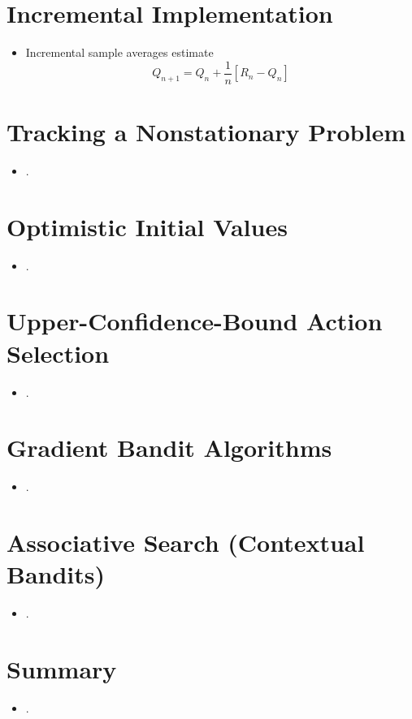 \documentclass{article}
\begin{document}
\section{Incremental Implementation}
\begin{itemize}
    \item Incremental sample averages estimate 
    $$ Q_{n+1} = Q_n + \frac{1}{n}[R_n - Q_n] $$
\end{itemize}

\section{Tracking a Nonstationary Problem}
\begin{itemize}
    \item .
\end{itemize}

\section{Optimistic Initial Values}
\begin{itemize}
    \item .
\end{itemize}

\section{Upper-Confidence-Bound Action Selection}
\begin{itemize}
    \item .
\end{itemize}

\section{Gradient Bandit Algorithms}
\begin{itemize}
    \item .
\end{itemize}

\section{Associative Search (Contextual Bandits)}
\begin{itemize}
    \item .
\end{itemize}

\section{Summary}
\begin{itemize}
    \item .
\end{itemize}
\end{document}
